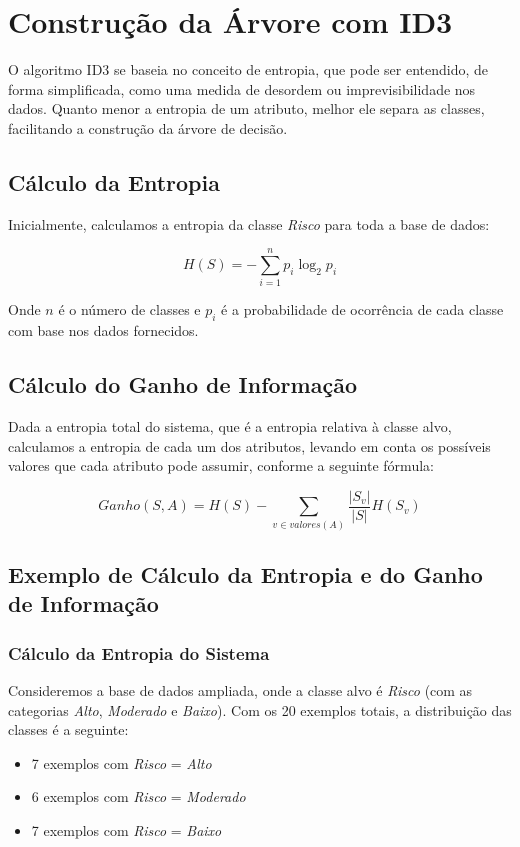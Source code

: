 \documentclass[a4paper,12pt]{article}
\begin{document}
\section{Construção da Árvore com ID3}
O algoritmo ID3 se baseia no conceito de entropia, que pode ser entendido, de forma simplificada, como uma medida de desordem ou imprevisibilidade nos dados. Quanto menor a entropia de um atributo, melhor ele separa as classes, facilitando a construção da árvore de decisão.

\subsection{Cálculo da Entropia}
Inicialmente, calculamos a entropia da classe \textit{Risco} para toda a base de dados:

\[
H(S) = -\sum_{i=1}^{n} p_i \log_2 p_i
\]

Onde \(n\) é o número de classes e \(p_i\) é a probabilidade de ocorrência de cada classe com base nos dados fornecidos.

\subsection{Cálculo do Ganho de Informação}
Dada a entropia total do sistema, que é a entropia relativa à classe alvo, calculamos a entropia de cada um dos atributos, levando em conta os possíveis valores que cada atributo pode assumir, conforme a seguinte fórmula:

\[
Ganho(S, A) = H(S) - \sum_{v \in valores(A)} \frac{|S_v|}{|S|} H(S_v)
\]

\subsection{Exemplo de Cálculo da Entropia e do Ganho de Informação}

\subsubsection{Cálculo da Entropia do Sistema}
Consideremos a base de dados ampliada, onde a classe alvo é \textit{Risco} (com as categorias \textit{Alto}, \textit{Moderado} e \textit{Baixo}). Com os 20 exemplos totais, a distribuição das classes é a seguinte:

\begin{itemize}
    \item 7 exemplos com \textit{Risco} = \textit{Alto}
    \item 6 exemplos com \textit{Risco} = \textit{Moderado}
    \item 7 exemplos com \textit{Risco} = \textit{Baixo}
\end{itemize}
\end{document}

